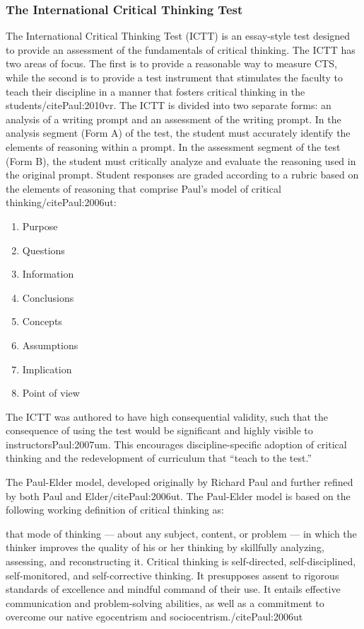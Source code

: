 \subsubsection{The International Critical Thinking Test}

The International Critical Thinking Test (ICTT) is an essay-style test designed to provide an assessment of the fundamentals of critical thinking. The ICTT has two areas of focus. The first is to provide a reasonable way to measure CTS, while the second is to provide a test instrument that stimulates the faculty to teach their discipline in a manner that fosters critical thinking in the students/cite{Paul:2010vr}. The ICTT is divided into two separate forms: an analysis of a writing prompt and an assessment of the writing prompt. In the analysis segment (Form A) of the test, the student must accurately identify the elements of reasoning within a prompt. In the assessment segment of the test (Form B), the student must critically analyze and evaluate the reasoning used in the original prompt. Student responses are graded according to a rubric based on the elements of reasoning that comprise Paul’s model of critical thinking/cite{Paul:2006ut}:

\begin{enumerate}
\item Purpose
\item Questions
\item Information
\item Conclusions
\item Concepts
\item Assumptions
\item Implication
\item Point of view
\end{enumerate}

The ICTT was authored to have high consequential validity, such that the consequence of using the test would be significant and highly visible to instructors{Paul:2007um}. This encourages discipline-specific adoption of critical thinking and the redevelopment of curriculum that “teach to the test.”

The Paul-Elder model, developed originally by Richard Paul and further refined by both Paul and Elder/cite{Paul:2006ut}. The Paul-Elder model is based on the following working definition of critical thinking as:

that mode of thinking — about any subject, content, or problem — in which the thinker improves the quality of his or her thinking by skillfully analyzing, assessing, and reconstructing it. Critical thinking is self-directed, self-disciplined, self-monitored, and self-corrective thinking. It presupposes assent to rigorous standards of excellence and mindful command of their use. It entails effective communication and problem-solving abilities, as well as a commitment to overcome our native egocentrism and sociocentrism./cite{Paul:2006ut}

